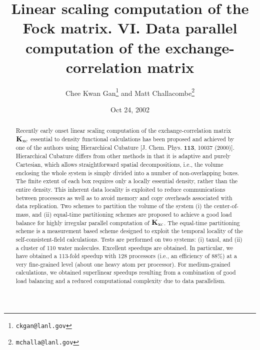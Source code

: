 \documentclass[preprint]{revtex4}
\newcommand{\Kxc}{{\bf K}_{\mathrm{xc}}}
\begin{document}
\title[Short Title]{ Linear scaling computation of the Fock
matrix. VI. Data parallel computation of the exchange-correlation
matrix }

\author{Chee Kwan Gan\footnote{{\tt ckgan@lanl.gov}} and Matt
Challacombe\footnote{{\tt mchalla@lanl.gov}}}
 

\date{Oct 24, 2002}

\begin{abstract}
Recently early onset linear scaling computation of the
exchange-correlation matrix $\Kxc$ essential to density functional
calculations has been proposed and achieved by one of the authors
using Hierarchical Cubature [J. Chem. Phys. {\bf 113}, 10037 (2000)].
Hierarchical Cubature differs from other methods in that it is
adaptive and purely Cartesian, which allows straightforward spatial
decompositions, i.e., the volume enclosing the whole system is simply
divided into a number of non-overlapping boxes. The finite extent of
each box requires only a locally essential density, rather than the
entire density.  This inherent data locality is exploited to reduce
communications between processors as well as to avoid memory and copy
overheads associated with data replication.  Two schemes to partition
the volume of the system (i) the center-of-mass, and (ii) equal-time
partitioning schemes are proposed to achieve a good load balance for
highly irregular parallel computation of $\Kxc$.  The equal-time
partitioning scheme is a measurement based scheme designed to exploit
the temporal locality of the self-consistent-field calculations.
Tests are performed on two systems: (i) taxol, and (ii) a cluster of
110 water molecules. Excellent speedups are obtained. In particular,
we have obtained a 113-fold speedup with 128 processors (i.e., an
efficiency of 88\%) at a very fine-grained level (about one heavy atom
per processor).  For medium-grained calculations, we obtained
superlinear speedups resulting from a combination of good load
balancing and a reduced computational complexity due to data
parallelism.
\end{abstract}

\maketitle
\end{document}
